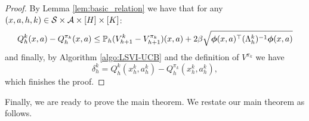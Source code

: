 \begin{proof} By Lemma \ref{lem:basic_relation} we have that for any $(x, a, h, k) \in \mathcal{S} \times \mathcal{A} \times [H] \times [K]$:
\begin{equation*}
Q^k_h(x, a) - Q^{\pi_k}_h(x, a)
\le \mathbb{P}_h (V^{k}_{h+1} - V^{\pi_k}_{h+1})(x, a)
+ 2\beta \sqrt{\bm{\phi}(x, a)^{\top} (\Lambda^k_h)^{-1}  \bm{\phi}(x, a)}
\end{equation*}
and finally, by Algorithm \ref{algo:LSVI-UCB} and the definition of $V^{\pi_k}$ we have
$$\delta^k_h = Q^k_h(x^{k}_h, a^{k}_h) - Q^{\pi_k}_h(x^{k}_h, a^{k}_h), $$
which finishes the proof.
\end{proof}

Finally, we are ready to prove the main theorem. We restate our main theorem as follows.

\THMmain*

